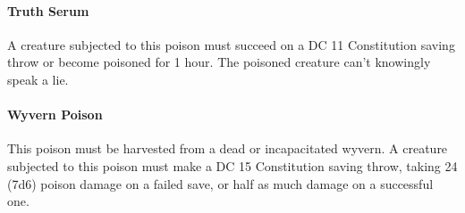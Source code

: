     \paragraph{Truth Serum}
        A creature subjected to this poison must succeed on a DC 11 Constitution saving throw or become poisoned for 1 hour.
        The poisoned creature can't knowingly speak a lie.
    \paragraph{Wyvern Poison}
        This poison must be harvested from a dead or incapacitated wyvern.
        A creature subjected to this poison must make a DC 15 Constitution saving throw, taking 24 (7d6) poison damage on a failed save, or half as much damage on a successful one.
